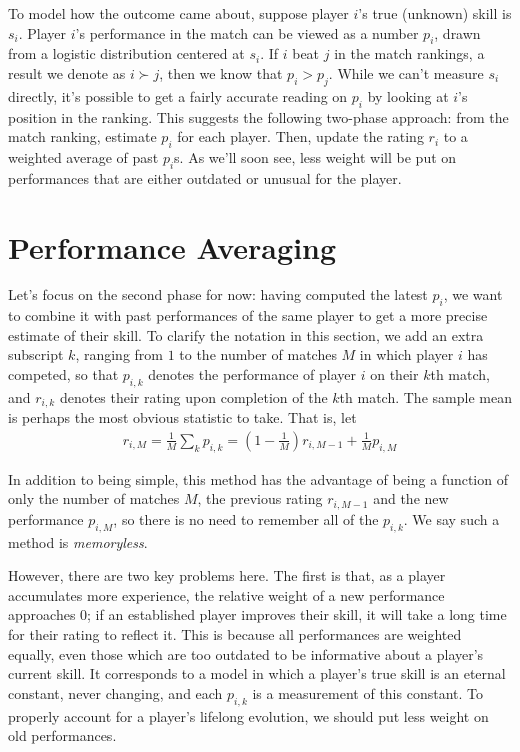 \documentclass{article}
\begin{document}
To model how the outcome came about, suppose player $i$'s true (unknown) skill is $s_i$. Player $i$'s performance in the match can be viewed as a number $p_i$, drawn from a logistic distribution centered at $s_i$. If $i$ beat $j$ in the match rankings, a result we denote as $i \succ j$, then we know that $p_i > p_j$. While we can't measure $s_i$ directly, it's possible to get a fairly accurate reading on $p_i$ by looking at $i$'s position in the ranking. This suggests the following two-phase approach: from the match ranking, estimate $p_i$ for each player. Then, update the rating $r_i$ to a weighted average of past $p_i$s. As we'll soon see, less weight will be put on performances that are either outdated or unusual for the player.

\section{Performance Averaging}

Let's focus on the second phase for now: having computed the latest $p_i$, we want to combine it with past performances of the same player to get a more precise estimate of their skill. To clarify the notation in this section, we add an extra subscript $k$, ranging from $1$ to the number of matches $M$ in which player $i$ has competed, so that $p_{i,k}$ denotes the performance of player $i$ on their $k$th match, and $r_{i,k}$ denotes their rating upon completion of the $k$th match. The sample mean is perhaps the most obvious statistic to take. That is, let
\begin{align}
r_{i,M} = \frac{1}{M} \sum_k p_{i,k} = \left(1 - \frac{1}{M}\right) r_{i,M-1} +  \frac{1}{M} p_{i,M}
\end{align}

In addition to being simple, this method has the advantage of being a function of only the number of matches $M$, the previous rating $r_{i,M-1}$ and the new performance $p_{i,M}$, so there is no need to remember all of the $p_{i,k}$. We say such a method is \emph{memoryless}.

However, there are two key problems here. The first is that, as a player accumulates more experience, the relative weight of a new performance approaches $0$; if an established player improves their skill, it will take a long time for their rating to reflect it. This is because all performances are weighted equally, even those which are too outdated to be informative about a player's current skill. It corresponds to a model in which a player's true skill is an eternal constant, never changing, and each $p_{i,k}$ is a measurement of this constant. To properly account for a player's lifelong evolution, we should put less weight on old performances.
\end{document}
